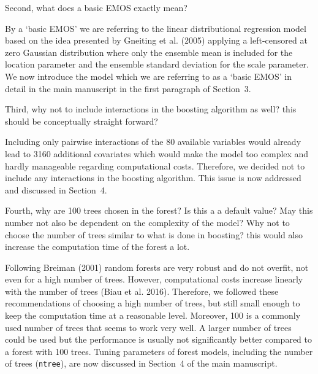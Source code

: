 \documentclass[american,foldmarks=false,noconfig]{uibklttr}
\newenvironment{review}{\fontshape{\itdefault}\fontseries{\bfdefault} \selectfont \smallskip}{\par}
\begin{document}
\begin{review}
Second, what does a basic EMOS exactly mean? 
\end{review}

By a `basic EMOS' we are referring to the linear distributional 
regression model based on the idea presented by Gneiting et al. (2005) 
applying a left-censored at zero Gaussian distribution where only the 
ensemble mean is included for the location parameter and the ensemble 
standard deviation for the scale parameter.
We now introduce the model which we are referring to as a `basic EMOS'
in detail in the main manuscript in the first paragraph of Section~3. 



\begin{review}
Third, why not to include interactions in the boosting algorithm 
as well? this should be conceptually straight forward? 
\end{review}

Including only pairwise interactions
of the 80 available variables would already lead to 3160 additional
covariates which would make the model too complex and hardly manageable
regarding computational costs. Therefore, we decided not to include
any interactions in the boosting algorithm.
This issue is now addressed and discussed in Section~4.

\begin{review}
Fourth, why are 100 trees chosen in the forest? Is this a a default 
value? May this number not also be dependent on the complexity of 
the model? Why not to choose the number of trees similar to what is 
done in boosting? this would also increase the computation time of 
the forest a lot.
\end{review}


Following Breiman (2001) random forests are very robust and do not overfit, 
not even for a high number of trees. However, computational costs increase 
linearly with the number of trees (Biau et al. 2016).
Therefore, we followed these recommendations of choosing a high number of
trees, but still small enough to keep the computation time at
a reasonable level. Moreover, 100 is a commonly used number of trees that
seems to work very well. A larger number of trees could be used but 
the performance is usually not significantly better compared to a forest with 
100 trees. Tuning parameters of forest models, including the number of 
trees (\texttt{ntree}), are now discussed in Section~4 
of the main manuscript.
\end{document}
